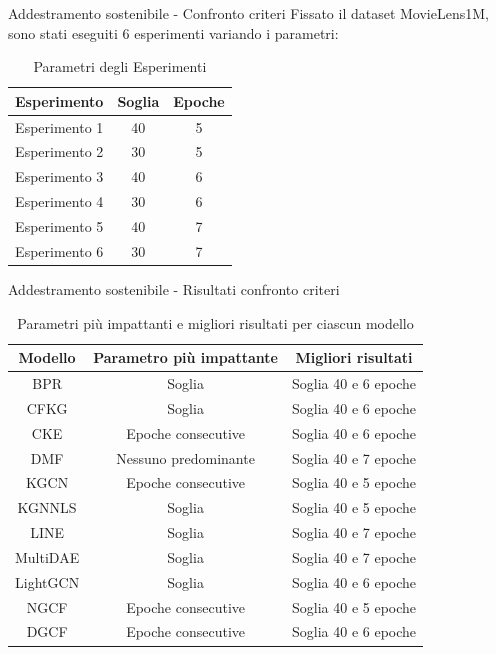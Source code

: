 \begin{frame}{Addestramento sostenibile - Confronto criteri}
    Fissato il dataset MovieLens1M, sono stati eseguiti 6 esperimenti variando i parametri:
    \begin{table}[]
        \centering
        \begin{tabular}{|c|c|c|}
            \hline
            \textbf{Esperimento} & \textbf{Soglia} & \textbf{Epoche} \\ \hline
            Esperimento 1 & 40 & 5 \\ \hline
            Esperimento 2 & 30 & 5 \\ \hline
            Esperimento 3 & 40 & 6 \\ \hline
            Esperimento 4 & 30 & 6 \\ \hline
            Esperimento 5 & 40 & 7 \\ \hline
            Esperimento 6 & 30 & 7 \\ \hline
        \end{tabular}
        \caption{Parametri degli Esperimenti}
    \end{table}
\end{frame}


\begin{frame}{Addestramento sostenibile - Risultati confronto criteri}
\begin{table}[H]
    \scriptsize
    \centering
    \begin{tabular}{|c|c|c|}
        \hline
        \textbf{Modello} & \textbf{Parametro più impattante} & \textbf{Migliori risultati} \\
        \hline
        BPR & Soglia & Soglia 40 e 6 epoche \\
        \hline
        CFKG & Soglia & Soglia 40 e 6 epoche \\
        \hline
        CKE & Epoche consecutive & Soglia 40 e 6 epoche \\
        \hline
        DMF & Nessuno predominante & Soglia 40 e 7 epoche \\
        \hline
        KGCN & Epoche consecutive & Soglia 40 e 5 epoche \\
        \hline
        KGNNLS & Soglia & Soglia 40 e 5 epoche \\
        \hline
        LINE & Soglia & Soglia 40 e 7 epoche \\
        \hline
        MultiDAE & Soglia & Soglia 40 e 7 epoche \\
        \hline
        LightGCN & Soglia & Soglia 40 e 6 epoche \\
        \hline
        NGCF & Epoche consecutive & Soglia 40 e 5 epoche \\
        \hline
        DGCF & Epoche consecutive & Soglia 40 e 6 epoche \\
        \hline
    \end{tabular}
    \caption{Parametri più impattanti e migliori risultati per ciascun modello}
\end{table}
\end{frame}


